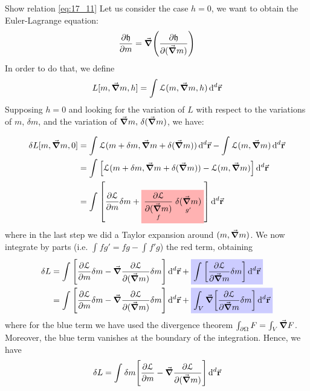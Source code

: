 \documentclass[../../Main/Main.tex]{subfiles}
\begin{document}
\begin{example}{Show relation \eqref{eq:17_11}}{}
Let us consider the case \( h=0 \), we want to obtain the Euler-Lagrange equation:
\begin{equation*}
  \pdv{\mathfrak{h} }{m} = \va{\grad } \qty(  \pdv{\mathfrak{h}}{(\va{\grad } m)})
\end{equation*}
In order to do that, we define
  \begin{equation*}
    L [m, \va{\grad } m,h] = \int_{}^{}  \mathcal{L} (m, \va{\grad } m,h)\dd[d]{\va{r}}
  \end{equation*}
Supposing \( h=0 \)  and looking for the variation of \( L \) with respect to the variations of \( m,\, \delta m \),  and the variation of \( \va{\grad } m, \, \delta (\va{\grad } m) \), we have:

  \begin{equation*}
  \begin{split}
  \delta L [m, \va{\grad } m,0]  &=  \int_{}^{} \mathcal{L} (m+\delta m, \va{\grad } m + \delta (\va{\grad } m))  \dd[d]{\va{r}} - \int_{}^{}  \mathcal{L} (m,\va{\grad } m) \dd[d]{\va{r}}   \\
  & = \int_{}^{}  \qty[\mathcal{L} (m+\delta m, \va{\grad } m + \delta ( \va{\grad } m)) - \mathcal{L} (m, \va{\grad } m)] \dd[d]{\va{r}} \\
  & = \int_{}^{} \qty[\pdv{\mathcal{L}}{m} \delta m +
  \mathcolorbox{red!30}{ \underset{f}{\pdv{\mathcal{L}}{(\va{\grad } m)} } \underset{g'}{\delta (\va{\grad } m) }  }
  ] \dd[d]{\va{r}}
  \end{split}
  \end{equation*}
  where in the last step we did a Taylor expansion around \( (m, \va{\grad } m) \).
  We now integrate by parts (i.e. \( \int_{}^{} f g' = fg - \int_{}^{} f'g     \)) the red term, obtaining
  \begin{equation*}
  \begin{split}
  \delta L &= \int_{}^{} \qty[\pdv{\mathcal{L}}{m} \delta m - \va{\grad } \pdv{\mathcal{L}}{(\va{\grad } m)} \delta m ] \dd[d]{\va{r}} +
  \mathcolorbox{blue!20}{\int_{}^{}  \qty[\pdv{\mathcal{L}}{\va{\grad } m} \delta m ] \dd[d]{\va{r}} }
  \\
   & = \int_{}^{}  \qty[\pdv{\mathcal{L}}{m} \delta m - \va{\grad } \pdv{\mathcal{L}}{(\va{\grad } m)} \delta m ]\dd[d]{\va{r}} + \mathcolorbox{blue!20}{\int_{V}^{}  \va{\grad } \qty[\pdv{\mathcal{L}}{\va{\grad } m} \delta m ] \dd[d]{\va{r}} }
  \end{split}
  \end{equation*}
  where for the blue term we have used the divergence theorem \( \int_{\partial{ \Omega }}^{} F = \int_{V}^{} \va{\grad } F     \). Moreover, the blue term vanishes at the boundary of the integration. Hence, we have
  \begin{equation*}
    \delta L = \int_{}^{} \delta m \qty[\pdv{\mathcal{L}}{m} - \va{\grad } \pdv{\mathcal{L}}{(\va{\grad } m)}  ]  \dd[d]{\va{r}}
  \end{equation*}


\end{example}
\end{document}
